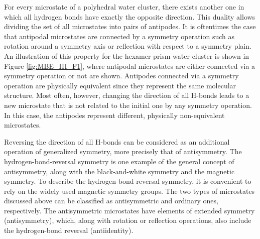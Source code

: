 \documentclass[11pt, proquest]{uwthesis}[2020/02/24]
\begin{document}


\par For every microstate of a polyhedral water cluster, there exists another one in which all hydrogen bonds have exactly the opposite direction. This duality allows dividing the set of all microstates into pairs of antipodes. It is oftentimes the case that antipodal microstates are connected by a symmetry operation such as rotation around a symmetry axis or reflection with respect to a symmetry plain. An illustration of this property for the hexamer prism water cluster is shown in Figure \ref{fig:MBE_III_F1}, where antipodal microstates are either connected via a symmetry operation or not are shown. Antipodes connected via a symmetry operation are physically equivalent since they represent the same molecular structure. Most often, however, changing the direction of all H-bonds leads to a new microstate that is not related to the initial one by any symmetry operation. In this case, the antipodes represent different, physically non-equivalent microstates. 

\par Reversing the direction of all H-bonds can be considered as an additional operation of generalized symmetry, more precisely that of antisymmetry. The hydrogen-bond-reversal symmetry\autocite{kirov_hydrogen-bond-reversal_2016} is one example of the general concept of antisymmetry, along with the black-and-white symmetry\autocite{shubnikov_symmetry_1951,mackay_extensions_1957} and the magnetic symmetry.\autocite{hamermesh_group_2012,lifshitz_statistical_2013} To describe the hydrogen-bond-reversal symmetry, it is convenient to rely on the widely used magnetic symmetry groups.\autocite{litvin_magnetic_2013} The two types of microstates discussed above can be classified as antisymmetric and ordinary ones, respectively. The antisymmetric microstates have elements of extended symmetry (antisymmetry), which, along with rotation or reflection operations, also include the hydrogen-bond reversal (antiidentity).
	
\end{document}
